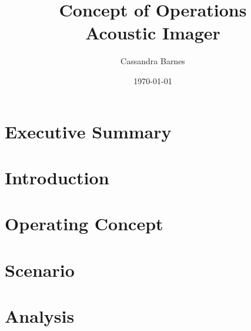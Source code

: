 \documentclass[12pt]{article}  %
\title{Concept of Operations\\Acoustic Imager}
\author{Cassandra Barnes}
\date{\today}
\begin{document}
\maketitle 


\pagebreak 
\section*{Executive Summary}


\section*{Introduction}


\section*{Operating Concept}


\section*{Scenario}



\section*{Analysis}
\end{document}
